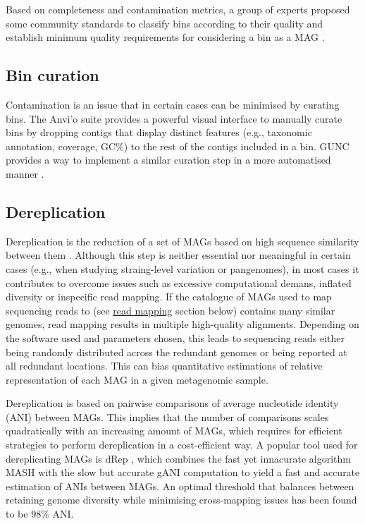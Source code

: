\documentclass[
]{book}
\begin{document}
Based on completeness and contamination metrics, a group of experts proposed some community standards to classify bins according to their quality and establish minimum quality requirements for considering a bin as a MAG \citep{Bowers2017-kj}.

\hypertarget{genome-resolved-curation}{%
\subsection*{Bin curation}\label{genome-resolved-curation}}

Contamination is an issue that in certain cases can be minimised by curating bins. The Anvi'o suite \citep{Eren2015-tt} provides a powerful visual interface to manually curate bins by dropping contigs that display distinct features (e.g., taxonomic annotation, coverage, GC\%) to the rest of the contigs included in a bin. GUNC provides a way to implement a similar curation step in a more automatised manner \citep{Orakov2021-pt}.

\hypertarget{genome-resolved-dereplication}{%
\subsection*{Dereplication}\label{genome-resolved-dereplication}}

Dereplication is the reduction of a set of MAGs based on high sequence similarity between them \citep{Evans2020-hs}. Although this step is neither essential nor meaningful in certain cases (e.g., when studying straing-level variation or pangenomes), in most cases it contributes to overcome issues such as excessive computational demans, inflated diversity or inspecific read mapping. If the catalogue of MAGs used to map sequencing reads to (see \protect\hyperlink{genome-resolved-mapping}{read mapping} section below) contains many similar genomes, read mapping results in multiple high-quality alignments. Depending on the software used and parameters chosen, this leads to sequencing reads either being randomly distributed across the redundant genomes or being reported at all redundant locations. This can bias quantitative estimations of relative representation of each MAG in a given metagenomic sample.

Dereplication is based on pairwise comparisons of average nucleotide identity (ANI) between MAGs. This implies that the number of comparisons scales quadratically with an increasing amount of MAGs, which requires for efficient strategies to perform dereplication in a cost-efficient way. A popular tool used for dereplicating MAGs is dRep \citep{Olm2017-nx}, which combines the fast yet innacurate algorithm MASH with the slow but accurate gANI computation to yield a fast and accurate estimation of ANIs between MAGs. An optimal threshold that balances between retaining genome diversity while minimising cross-mapping issues has been found to be 98\% ANI.
\end{document}

